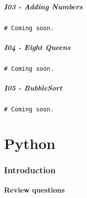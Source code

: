\documentclass[article,A4,12pt]{llncs}
\begin{document}
\subsubsection{I03 - Adding Numbers}

\begin{verbatim}
# Coming soon.
\end{verbatim}

\subsubsection{I04 - Eight Queens}

\begin{verbatim}
# Coming soon.
\end{verbatim}

\subsubsection{I05 - BubbleSort}

\begin{verbatim}
# Coming soon.
\end{verbatim}










\part{Python}

\setcounter{section}{0}
\section{Introduction}

\subsection{Review questions}
\end{document}
